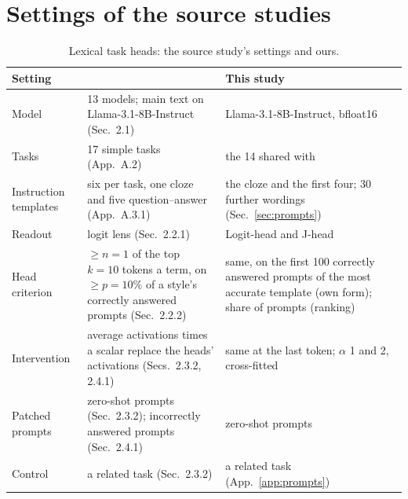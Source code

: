 \documentclass[10pt,a4paper]{article}
\begin{document}
\section{Settings of the source studies}\label{app:fidelity}

\begin{table}[H]
\centering\small
\begin{tabularx}{\textwidth}{@{}>{\raggedright\arraybackslash}p{3.2cm}LL@{}}
\toprule
Setting & \citet{yang2026shared} & This study \\
\midrule
Model & 13 models; main text on Llama-3.1-8B-Instruct (Sec.~2.1) & Llama-3.1-8B-Instruct, bfloat16 \\
Tasks & 17 simple tasks (App.~A.2) & the 14 shared with \citet{davidson2025different} \\
Instruction templates & six per task, one cloze and five question--answer (App.~A.3.1) & the cloze and the first four; 30 further wordings (Sec.~\ref{sec:prompts}) \\
Readout & logit lens (Sec.~2.2.1) & Logit-head and J-head \\
Head criterion & $\geq n{=}1$ of the top $k{=}10$ tokens a term, on $\geq p{=}10\%$ of a style's correctly answered prompts (Sec.~2.2.2) & same, on the first 100 correctly answered prompts of the most accurate template (own form); share of prompts (ranking) \\
Intervention & average activations times a scalar replace the heads' activations (Secs.~2.3.2, 2.4.1) & same at the last token; $\alpha$ 1 and 2, cross-fitted \\
Patched prompts & zero-shot prompts (Sec.~2.3.2); incorrectly answered prompts (Sec.~2.4.1) & zero-shot prompts \\
Control & a related task (Sec.~2.3.2) & a related task (App.~\ref{app:prompts}) \\
\bottomrule
\end{tabularx}
\caption{Lexical task heads: the source study's settings and ours.}
\label{tab:fid-yang}
\end{table}
\end{document}
